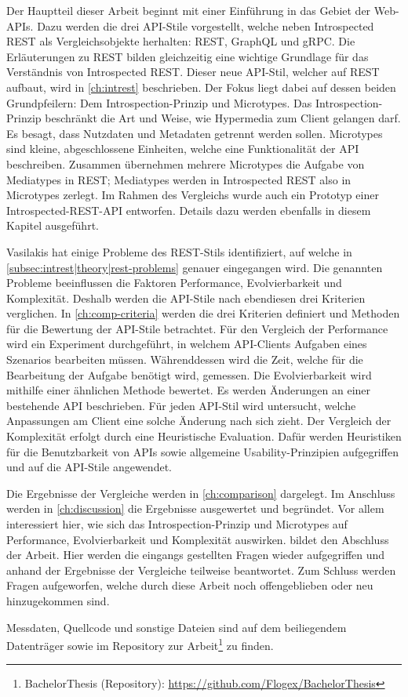 \para{}Der Hauptteil dieser Arbeit beginnt mit einer Einführung in das Gebiet der Web-APIs. Dazu werden die drei API-Stile vorgestellt, welche neben Introspected REST als Vergleichsobjekte herhalten: REST, GraphQL und gRPC. Die Erläuterungen zu REST bilden gleichzeitig eine wichtige Grundlage für das Verständnis von Introspected REST. Dieser neue API-Stil, welcher auf REST aufbaut, wird in \cref{ch:intrest} beschrieben. Der Fokus liegt dabei auf dessen beiden Grundpfeilern: Dem Introspection-Prinzip und Microtypes. Das Introspection-Prinzip beschränkt die Art und Weise, wie Hypermedia zum Client gelangen darf. Es besagt, dass Nutzdaten und Metadaten getrennt werden sollen. Microtypes sind kleine, abgeschlossene Einheiten, welche eine Funktionalität der API beschreiben. Zusammen übernehmen mehrere Microtypes die Aufgabe von Mediatypes in REST; Mediatypes werden in Introspected REST also in Microtypes zerlegt. Im Rahmen des Vergleichs wurde auch ein Prototyp einer Introspected-REST-API entworfen. Details dazu werden ebenfalls in diesem Kapitel ausgeführt.

Vasilakis hat einige Probleme des REST-Stils identifiziert, auf welche in \cref{subsec:intrest|theory|rest-problems} genauer eingegangen wird. Die genannten Probleme beeinflussen die Faktoren Performance, Evolvierbarkeit und Komplexität. Deshalb werden die API-Stile nach ebendiesen drei Kriterien verglichen. In \cref{ch:comp-criteria} werden die drei Kriterien definiert und Methoden für die Bewertung der API-Stile betrachtet. Für den Vergleich der Performance wird ein Experiment durchgeführt, in welchem API-Clients Aufgaben eines Szenarios bearbeiten müssen. Währenddessen wird die Zeit, welche für die Bearbeitung der Aufgabe benötigt wird, gemessen. Die Evolvierbarkeit wird mithilfe einer ähnlichen Methode bewertet. Es werden Änderungen an einer bestehende API beschrieben. Für jeden API-Stil wird untersucht, welche Anpassungen am Client eine solche Änderung nach sich zieht. Der Vergleich der Komplexität erfolgt durch eine Heuristische Evaluation. Dafür werden Heuristiken für die Benutzbarkeit von APIs sowie allgemeine Usability-Prinzipien aufgegriffen und auf die API-Stile angewendet.

Die Ergebnisse der Vergleiche werden in \cref{ch:comparison} dargelegt. Im Anschluss werden in \cref{ch:discussion} die Ergebnisse ausgewertet und begründet. Vor allem interessiert hier, wie sich das Introspection-Prinzip und Microtypes auf Performance, Evolvierbarkeit und Komplexität auswirken.  bildet den Abschluss der Arbeit. Hier werden die eingangs gestellten Fragen wieder aufgegriffen und anhand der Ergebnisse der Vergleiche teilweise beantwortet. Zum Schluss werden Fragen aufgeworfen, welche durch diese Arbeit noch offengeblieben oder neu hinzugekommen sind.

\para{}Messdaten, Quellcode und sonstige Dateien sind auf dem beiliegendem Datenträger sowie im Repository zur Arbeit\footnote{BachelorThesis (Repository): \url{https://github.com/Flogex/BachelorThesis}} zu finden.